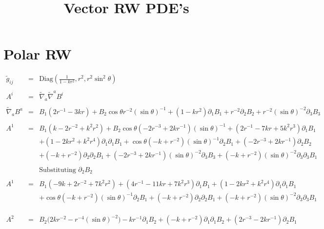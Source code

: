 \documentclass[10pt,letterpaper]{article}
\title{Vector RW PDE's}
\date{}
\numberwithin{equation}{section}
\begin{document}
 
\maketitle
\noindent 
\section{Polar RW}
\begin{eqnarray}
\tilde g_{ij} &=& \text{Diag}\left(\frac{1}{1-kr^2},r^2,r^2\sin^2\theta\right)
\\ \nonumber\\
A^i &=& \tilde\nabla_a\tilde\nabla^a B^i
\\ \nonumber\\
\tilde\nabla_a B^a &=& B_{1} (2 r^{-1} - 3 k r) + B_{2} \cos\theta r^{-2} (\sin\theta)^{-1} + (1 -  k r^2) \partial_{1}B_{1} + r^{-2} \partial_{2}B_{2} + r^{-2} (\sin\theta)^{-2} \partial_{3}B_{3}
\\ \nonumber\\
A^{1}&=& B_{1} (k - 2 r^{-2} + k^2 r^2) + B_{2} \cos\theta (-2 r^{-3} + 2 k r^{-1}) (\sin\theta)^{-1} + (2 r^{-1} - 7 k r + 5 k^2 r^3) \partial_{1}B_{1} \nonumber \\ 
&& + (1 - 2 k r^2 + k^2 r^4) \partial_{1}\partial_{1}B_{1} + \cos\theta (- k + r^{-2}) (\sin\theta)^{-1} \partial_{2}B_{1} + (-2 r^{-3} + 2 k r^{-1}) \partial_{2}B_{2} \nonumber \\ 
&& + (- k + r^{-2}) \partial_{2}\partial_{2}B_{1} + (-2 r^{-3} + 2 k r^{-1}) (\sin\theta)^{-2} \partial_{3}B_{3} + (- k + r^{-2}) (\sin\theta)^{-2} \partial_{3}\partial_{3}B_{1}
\\ \nonumber\\
&&\text{Substituting $\partial_2 B_2$}
\\ \nonumber\\
A^{1}&=& B_{1} (-9 k + 2 r^{-2} + 7 k^2 r^2) + (4 r^{-1} - 11 k r + 7 k^2 r^3) \partial_{1}B_{1} + (1 - 2 k r^2 + k^2 r^4) \partial_{1}\partial_{1}B_{1} \nonumber \\ 
&& + \cos\theta (- k + r^{-2}) (\sin\theta)^{-1} \partial_{2}B_{1} + (- k + r^{-2}) \partial_{2}\partial_{2}B_{1} + (- k + r^{-2}) (\sin\theta)^{-2} \partial_{3}\partial_{3}B_{1}
\\ \nonumber\\
\\ \nonumber\\
A^{2}&=& B_{2} \bigl(2 k r^{-2} -  r^{-4} (\sin\theta)^{-2}\bigr) -  k r^{-1} \partial_{1}B_{2} + (- k + r^{-2}) \partial_{1}\partial_{1}B_{2} + (2 r^{-3} - 2 k r^{-1}) \partial_{2}B_{1} \nonumber \\ 

\end{eqnarray}
\end{document}
